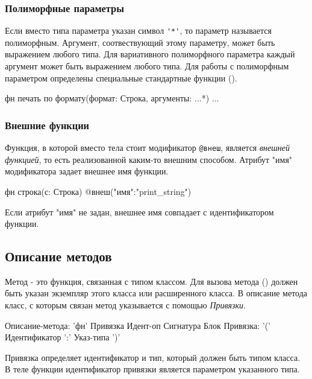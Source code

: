 \hypertarget{params-poly}{%
\subsubsection{Полиморфные параметры}\label{decls:params-poly}}

Если вместо типа параметра указан символ \verb|'*'|, то параметр называется полиморфным.
Аргумент, соотвествующий этому параметру, может быть выражением любого типа. 
Для вариативного полиморфного параметра каждый аргумент может быть выражением любого типа. 
Для работы с полиморфным параметром определены специальные стандартные функции ().

\begin{Trivil}
фн печать по формату(формат: Строка, аргументы: ...*) {
...
}
\end{Trivil}

\hypertarget{extern-fn}{%
\subsubsection{Внешние функции}\label{decls:extern-fn}}

Функция, в которой вместо тела стоит модификатор \verb|@внеш|, является \emph{внешней функцией}, то есть реализованной каким-то внешним способом.
Атрибут "имя" модификатора задает внешнее имя функции.

\begin{Trivil}
фн строка(с: Строка) @внеш("имя":"print_string")
\end{Trivil}

Если атрибут "имя" не задан, внешнее имя совпадает с идентификатором функции.

\hypertarget{methods}{%
\subsection{Описание методов}\label{decls:methods}}

Метод - это функция, связанная с типом классом. Для вызова метода () должен быть указан экземпляр этого класса или расширенного класса. 
В описание метода класс, с которым связан метод указывается с помощью \emph{Привязки}.

\begin{Grammar}
Описание-метода: 'фн' Привязка Идент-оп Сигнатура Блок
Привязка: '(' Идентификатор ':' Указ-типа ')'
\end{Grammar} 

Привязка определяет идентификатор и тип, который должен быть типом класса. В теле функции идентификатор привязки является параметром указанного типа.

